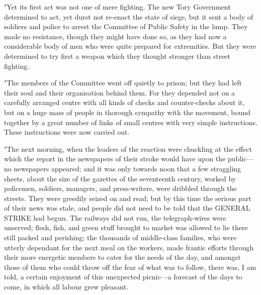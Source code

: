 "Yet its first act was not one of mere fighting. The new Tory Government
determined to act, yet durst not re-enact the state of siege, but it
sent a body of soldiers and police to arrest the Committee of Public
Safety in the lump. They made no resistance, though they might have done
so, as they had now a considerable body of men who were quite prepared
for extremities. But they were determined to try first a weapon which
they thought stronger than street fighting.

"The members of the Committee went off quietly to prison; but they had
left their soul and their organisation behind them. For they depended
not on a carefully arranged centre with all kinds of checks and
counter-checks about it, but on a huge mass of people in thorough
sympathy with the movement, bound together by a great number of links of
small centres with very simple instructions. These instructions were now
carried out.

"The next morning, when the leaders of the reaction were chuckling at
the effect which the report in the newspapers of their stroke would have
upon the public---no newspapers appeared; and it was only towards noon
that a few straggling sheets, about the size of the gazettes of the
seventeenth century, worked by policemen, soldiers, managers, and
press-writers, were dribbled through the streets. They were greedily
seized on and read; but by this time the serious part of their news was
stale, and people did not need to be told that the GENERAL STRIKE had
begun. The railways did not run, the telegraph-wires were unserved;
flesh, fish, and green stuff brought to market was allowed to lie there
still packed and perishing; the thousands of middle-class families, who
were utterly dependant for the next meal on the workers, made frantic
efforts through their more energetic members to cater for the needs of
the day, and amongst those of them who could throw off the fear of what
was to follow, there was, I am told, a certain enjoyment of this
unexpected picnic---a forecast of the days to come, in which all labour
grew pleasant.

